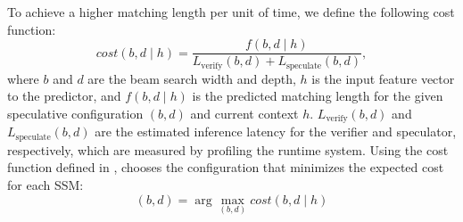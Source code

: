 To achieve a higher matching length per unit of time, we define the following cost function:
\begin{equation}
    cost(b, d \mid h) = \frac{f(b, d \mid h)}{L_{\text{verify}}(b, d) + L_{\text{speculate}}(b, d) },
    \label{eqn:cost_function}
\end{equation}
where $b$ and $d$ are the beam search width and depth, $h$ is the input feature vector to the predictor, and $f(b, d \mid h)$ is the predicted matching length for the given speculative configuration $(b, d)$ and current context $h$.
$L_{\text{verify}}(b, d)$ and $L_{\text{speculate}}(b, d)$ are the estimated inference latency for the verifier and speculator, respectively, which are measured by profiling the \Sys runtime system.
Using the cost function defined in , \Sys chooses the configuration that minimizes the expected cost for each SSM:
\begin{equation}
    (b, d) = \arg\max_{(b, d)} cost(b, d \mid h)
\end{equation}
\fi
